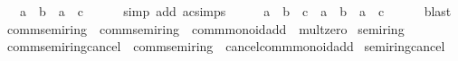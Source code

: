 \begin{isabellebody}
\ {\isachardoublequoteopen}{\isasymdots}\ {\isacharequal}{\kern0pt}\ a\ {\isacharasterisk}{\kern0pt}\ b\ {\isacharplus}{\kern0pt}\ a\ {\isacharasterisk}{\kern0pt}\ c{\isachardoublequoteclose}\isanewline
\ \ \ \ \isamarkupfalse%
\ {\isacharparenleft}{\kern0pt}simp\ add{\isacharcolon}{\kern0pt}\ ac{\isacharunderscore}{\kern0pt}simps{\isacharparenright}{\kern0pt}\isanewline
\ \ \isamarkupfalse%
\ \isamarkupfalse%
\ {\isachardoublequoteopen}a\ {\isacharasterisk}{\kern0pt}\ {\isacharparenleft}{\kern0pt}b\ {\isacharplus}{\kern0pt}\ c{\isacharparenright}{\kern0pt}\ {\isacharequal}{\kern0pt}\ a\ {\isacharasterisk}{\kern0pt}\ b\ {\isacharplus}{\kern0pt}\ a\ {\isacharasterisk}{\kern0pt}\ c{\isachardoublequoteclose}\isanewline
\ \ \ \ \isamarkupfalse%
\ blast\isanewline
{}\isamarkupfalse%
%
\endisatagproof
{\isafoldproof}%
%
\isadelimproof
\isanewline
%
\endisadelimproof
\isanewline
{}\isamarkupfalse%
\isanewline
\isanewline
{}\isamarkupfalse%
\ comm{\isacharunderscore}{\kern0pt}semiring{\isacharunderscore}{\kern0pt}{}\ {\isacharequal}{\kern0pt}\ comm{\isacharunderscore}{\kern0pt}semiring\ {\isacharplus}{\kern0pt}\ comm{\isacharunderscore}{\kern0pt}monoid{\isacharunderscore}{\kern0pt}add\ {\isacharplus}{\kern0pt}\ mult{\isacharunderscore}{\kern0pt}zero\isanewline
{}\isanewline
\isanewline
{}\isamarkupfalse%
\ semiring{\isacharunderscore}{\kern0pt}{}%
\isadelimproof
\ %
\endisadelimproof
%
\isatagproof
\isacommand{{\isachardot}{\kern0pt}{\isachardot}{\kern0pt}}\isamarkupfalse%
%
\endisatagproof
{\isafoldproof}%
%
\isadelimproof
%
\endisadelimproof
\isanewline
\isanewline
{}\isamarkupfalse%
\isanewline
\isanewline
{}\isamarkupfalse%
\ comm{\isacharunderscore}{\kern0pt}semiring{\isacharunderscore}{\kern0pt}{}{\isacharunderscore}{\kern0pt}cancel\ {\isacharequal}{\kern0pt}\ comm{\isacharunderscore}{\kern0pt}semiring\ {\isacharplus}{\kern0pt}\ cancel{\isacharunderscore}{\kern0pt}comm{\isacharunderscore}{\kern0pt}monoid{\isacharunderscore}{\kern0pt}add\isanewline
{}\isanewline
\isanewline
{}\isamarkupfalse%
\ semiring{\isacharunderscore}{\kern0pt}{}{\isacharunderscore}{\kern0pt}cancel%
\isadelimproof
\ %
\endisadelimproof
%
\isatagproof
\isacommand{{\isachardot}{\kern0pt}{\isachardot}{\kern0pt}}\isamarkupfalse%
%
\endisatagproof
{\isafoldproof}%
%
\isadelimproof
%
\endisadelimproof
\isanewline
\isanewline
{}\isamarkupfalse%

\end{isabellebody}
